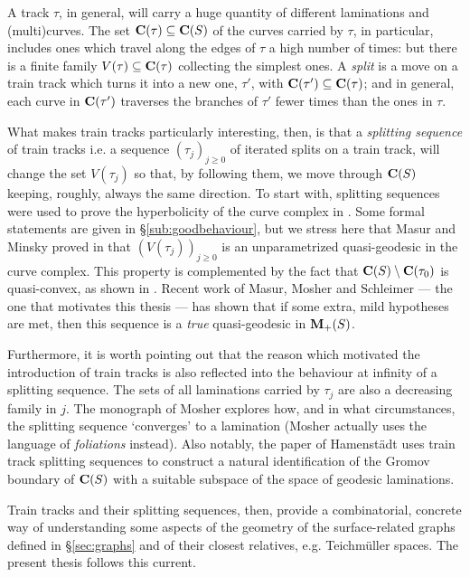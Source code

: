 A track $\tau$, in general, will carry a huge quantity of different laminations and (multi)curves. The set $\mathbf C(\tau)\subseteq \mathbf C(S)$ of the curves carried by $\tau$, in particular, includes ones which travel along the edges of $\tau$ a high number of times: but there is a finite family $V(\tau)\subseteq\mathbf C(\tau)$ collecting the simplest ones. A \emph{split} is a move on a train track which turns it into a new one, $\tau'$, with $\mathbf C(\tau')\subseteq\mathbf C(\tau)$; and in general, each curve in $\mathbf C(\tau')$ traverses the branches of $\tau'$ fewer times than the ones in $\tau$.

What makes train tracks particularly interesting, then, is that a \emph{splitting sequence} of train tracks i.e. a sequence $(\tau_j)_{j\geq 0}$ of iterated splits on a train track, will change the set $V(\tau_j)$ so that, by following them, we move through $\mathbf C(S)$ keeping, roughly, always the same direction. To start with, splitting sequences were used to prove the hyperbolicity of the curve complex in \cite{masurminskyi}. Some formal statements are given in \S \ref{sub:goodbehaviour}, but we stress here that Masur and Minsky proved in \cite{masurminskyq} that $\left(V(\tau_j)\right)_{j\geq 0}$ is an unparametrized quasi-geodesic in the curve complex. This property is complemented by the fact that $\mathbf C(S)\setminus\mathbf C(\tau_0)$ is quasi-convex, as shown in \cite{notcarried}. Recent work \cite{mms} of Masur, Mosher and Schleimer --- the one that motivates this thesis --- has shown that if some extra, mild hypotheses are met, then this sequence is a \emph{true} quasi-geodesic in ${\mathbf{M}_+}(S)$. 

Furthermore, it is worth pointing out that the reason which motivated the introduction of train tracks is also reflected into the behaviour at infinity of a splitting sequence. The sets of all laminations carried by $\tau_j$ are also a decreasing family in $j$. The monograph \cite{mosher} of Mosher explores how, and in what circumstances, the splitting sequence `converges' to a lamination (Mosher actually uses the language of \emph{foliations} instead). Also notably, the paper \cite{hamenstadt} of Hamenst\"adt uses train track splitting sequences to construct a natural identification of the Gromov boundary of $\mathbf C(S)$ with a suitable subspace of the space of geodesic laminations.

Train tracks and their splitting sequences, then, provide a combinatorial, concrete way of understanding some aspects of the geometry of the surface-related graphs defined in \S \ref{sec:graphs} and of their closest relatives, e.g. Teichm\"uller spaces. The present thesis follows this current.